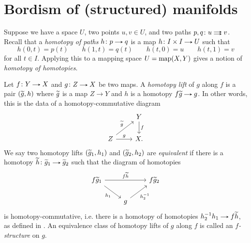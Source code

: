 
\section{Bordism of (structured) manifolds}

\begin{definition}
  \label{path-homotopy}
  Suppose we have a space $U$, two points $u,v \in U$, and two paths
  $p,q \c u \doubto v$. Recall that a \emph{homotopy of paths} $h \c p
  \to q$ is a map $h \c I \times I \to U$ such that
  \[
  h(0,t) = p(t) \qquad
  h(1,t) = q(t) \qquad
  h(t,0) = u \qquad
  h(t,1) = v
  \]
  for all $t \in I$. Applying this to a mapping space $U = \operatorname{map}(X,Y)$
  gives a notion of \emph{homotopy of homotopies}.
\end{definition}

\begin{definitions}
  \label{map-f-struct}
  Let $f \c Y \to X$ and $g \c Z \to X$ be two maps. A \emph{homotopy
    lift} of $g$ along $f$ is a pair $(\widetilde g, h)$ where $\widetilde g$ is a
  map $Z \to Y$ and $h$ is a homotopy $f\til g \to g$. In other words,
  this is the data of a homotopy-commutative diagram
  \[
  \begin{tikzcd}
    & Y \ar[d, "f"] \\ Z \ar[ur, "\til g"] \ar[r, "g"] & X.
  \end{tikzcd}
  \]
  We say two homotopy lifts $(\widetilde g_1, h_1)$ and $(\widetilde g_2, h_2)$
  are \emph{equivalent} if there is a homotopy $\til h \c \til g_1 \to
  \til g_2$ such that the diagram of homotopies
  \begin{equation}
    \label{lift-equiv}
    \begin{tikzcd}
      f\til g_1 \ar[rr, "f\til h"] \ar[dr, swap, "h_1"] & & f\til g_2
      \\ & g \ar[ur, swap, "h_2^{-1}"] &
    \end{tikzcd}
  \end{equation}
  is homotopy-commutative, i.e. there is a homotopy of homotopies
  $h_2^{-1}h_1 \to f\til h$, as defined in . An
  equivalence class of homotopy lifts of $g$ along $f$ is called an
  \emph{$f$-structure} on $g$.
\end{definitions}

